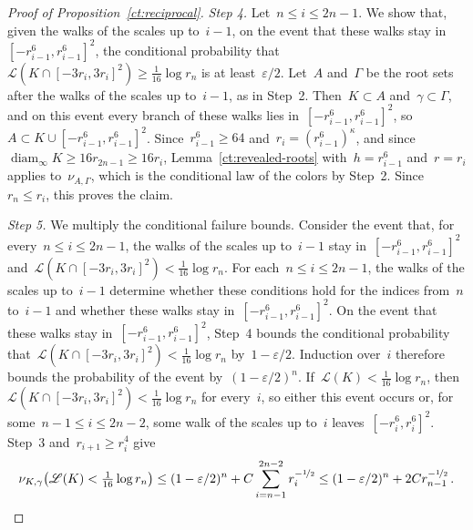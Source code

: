 \documentclass[11pt]{amsart}
\numberwithin{equation}{section}
\newcommand{\nf}{\nicefrac}
\newcommand{\cL}{\mathscr{L}}
\DeclareMathOperator{\diam}{diam}
\begin{document}
\begin{proof}[Proof of Proposition~\ref{ct:reciprocal}]
\emph{Step 4.} Let~$n\leq i\leq2n-1$. We show that, given the walks of the scales up to~$i-1$, on the event that these walks stay in~$[-r_{i-1}^6,r_{i-1}^6]^2$, the conditional probability that~$\cL(K\cap [-3r_i,3r_i]^2)\geq\tfrac1{16}\log r_n$ is at least~$\varepsilon/2$. Let~$A$ and~$\Gamma$ be the root sets after the walks of the scales up to~$i-1$, as in Step~2. Then~$K\subset A$ and~$\gamma\subset\Gamma$, and on this event every branch of these walks lies in~$[-r_{i-1}^6,r_{i-1}^6]^2$, so~$A\subset K\cup [-r_{i-1}^6,r_{i-1}^6]^2$. Since~$r_{i-1}^6\geq64$ and~$r_i=(r_{i-1}^6)^\kappa$, and since~$\diam_\infty K\geq16r_{2n-1}\geq16r_i$, Lemma~\ref{ct:revealed-roots} with~$h=r_{i-1}^6$ and~$r=r_i$ applies to~$\nu_{A,\Gamma}$, which is the conditional law of the colors by Step~2. Since~$r_n\leq r_i$, this proves the claim.

\emph{Step 5.} We multiply the conditional failure bounds. Consider the event that, for every~$n\leq i\leq2n-1$, the walks of the scales up to~$i-1$ stay in~$[-r_{i-1}^6,r_{i-1}^6]^2$ and~$\cL(K\cap [-3r_i,3r_i]^2)<\tfrac1{16}\log r_n$. For each~$n\leq i\leq2n-1$, the walks of the scales up to~$i-1$ determine whether these conditions hold for the indices from~$n$ to~$i-1$ and whether these walks stay in~$[-r_{i-1}^6,r_{i-1}^6]^2$. On the event that these walks stay in~$[-r_{i-1}^6,r_{i-1}^6]^2$, Step~4 bounds the conditional probability that~$\cL(K\cap [-3r_i,3r_i]^2)<\tfrac1{16}\log r_n$ by~$1-\varepsilon/2$. Induction over~$i$ therefore bounds the probability of the event by~$(1-\varepsilon/2)^n$. If~$\cL(K)<\tfrac1{16}\log r_n$, then~$\cL(K\cap [-3r_i,3r_i]^2)<\tfrac1{16}\log r_n$ for every~$i$, so either this event occurs or, for some~$n-1\leq i\leq2n-2$, some walk of the scales up to~$i$ leaves~$[-r_i^6,r_i^6]^2$. Step~3 and~$r_{i+1}\geq r_i^4$ give
\begin{equation*}
\nu_{K,\gamma}\bigl(\cL(K)<\tfrac1{16}\log r_n\bigr)\leq(1-\varepsilon/2)^n+C\sum_{i=n-1}^{2n-2}r_i^{-\nf12}\leq(1-\varepsilon/2)^n+2Cr_{n-1}^{-\nf12}\,.
\end{equation*}


\end{proof}
\end{document}
